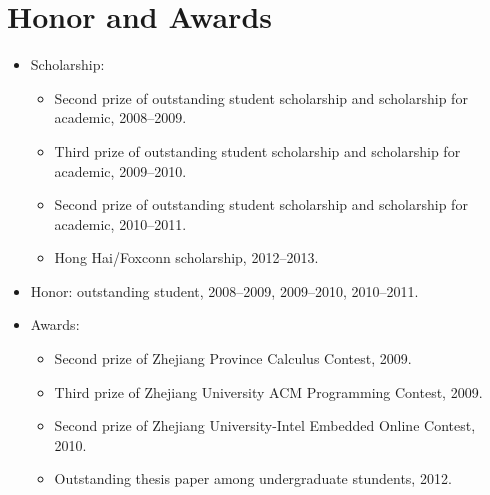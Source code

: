 \documentclass[letterpaper]{article}
\begin{document}
\section*{Honor and Awards}
\begin{itemize}
\item Scholarship:
    \begin{itemize}
    \item Second prize of outstanding student scholarship and scholarship for academic, 2008--2009.
    \item Third prize of outstanding student scholarship and scholarship for academic, 2009--2010.
    \item Second prize of outstanding student scholarship and scholarship for academic, 2010--2011.
    \item Hong Hai/Foxconn scholarship, 2012--2013.	
    \end{itemize}
\item Honor: outstanding student, 2008--2009, 2009--2010, 2010--2011.
\item Awards:
    \begin{itemize}
    \item Second prize of Zhejiang Province Calculus Contest, 2009.
    \item Third prize of Zhejiang University ACM Programming Contest, 2009.
    \item Second prize of Zhejiang University-Intel Embedded Online Contest, 2010.
    \item Outstanding thesis paper among undergraduate stundents, 2012.
    \end{itemize}
\end{itemize}

\end{document}
